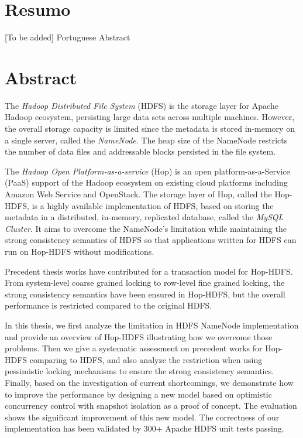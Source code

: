 \chapter*{Resumo}
\thispagestyle{empty}

[To be added] Portuguese Abstract

\newpage


\chapter*{Abstract}
\thispagestyle{empty}

The \textit{Hadoop Distributed File System} (HDFS) is the storage layer for Apache Hadoop ecosystem, persisting large data sets across multiple machines. However, the overall storage capacity is limited since the metadata is stored in-memory on a single server, called the \textit{NameNode}. The heap size of the NameNode restricts the number of data files and addressable blocks persisted in the file system.

\noindent The \textit{Hadoop Open Platform-as-a-service} (Hop) is an open platform-as-a-Service (PaaS) support of the Hadoop ecosystem on existing cloud platforms including Amazon Web Service and OpenStack. The storage layer of Hop, called the Hop-HDFS, is a highly available implementation of HDFS, based on storing the metadata in a distributed, in-memory, replicated database, called the \textit{MySQL Cluster}. It aims to overcome the NameNode's limitation while maintaining the strong consistency semantics of HDFS so that applications written for HDFS can run on Hop-HDFS without 
modifications.

\noindent Precedent thesis works have contributed for a transaction model for Hop-HDFS. From system-level coarse grained locking to row-level fine grained locking, the strong consistency semantics have been ensured in Hop-HDFS, but the overall performance is restricted compared to the original HDFS.

\noindent In this thesis, we first analyze the limitation in HDFS NameNode implementation and provide an overview of Hop-HDFS illustrating how we overcome those problems. Then we give a systematic assessment on precedent works for Hop-HDFS comparing to HDFS, and also analyze the restriction when using pessimistic locking mechanisms to ensure the strong consistency semantics. Finally, based on the investigation of current shortcomings, we demonstrate how to improve the performance by designing a new model based on optimistic concurrency control with snapshot isolation as a proof of concept. The evaluation shows the significant improvement of this new model. The correctness of our implementation has been validated by 300+ Apache HDFS unit tests passing.

